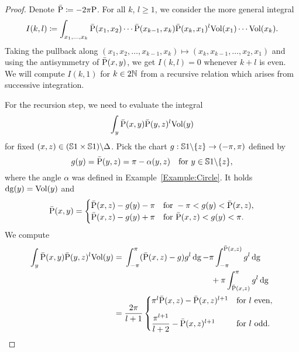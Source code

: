 \documentclass[\MainFolder/Text.tex]{subfiles}
\begin{document}
\begin{proof}
Denote $\bar{\mathrm{P}} \coloneqq -2\pi \mathrm{P}$. For all $k$, $l \ge 1$, we consider the more general integral
\[ I(k,l) \coloneqq \int_{x_1, \dotsc, x_k} \bar{\mathrm{P}}(x_1,x_2) \dotsm \bar{\mathrm{P}}(x_{k-1},x_k) \bar{\mathrm{P}}(x_k,x_1)^l\mathrm{Vol}(x_1) \dotsm \mathrm{Vol}(x_k). \]
Taking the pullback along $(x_1, x_2, \dotsc, x_{k-1}, x_k) \mapsto (x_k, x_{k-1}, \dotsc, x_2, x_1)$ and using the antisymmetry of $\bar{\mathrm{P}}(x,y)$, we get $I(k,l) = 0$ whenever $k+l$ is even. We will compute $I(k,1)$ for $k\in 2\mathbb{N}$ from a recursive relation which arises from successive integration.

For the recursion step, we need to evaluate the integral 
\[\int_{y} \bar{\mathrm{P}}(x,y)\bar{\mathrm{P}}(y,z)^l \mathrm{Vol}(y)\]
for fixed $(x,z)\in (\mathbb{S}{1}\times \mathbb{S}{1})\backslash\Delta$. Pick the chart $g: \mathbb{S}{1}\backslash\{z\} \rightarrow (-\pi,\pi)$ defined by 
\[ g(y)= \bar{\mathrm{P}}(y,z) =  \pi - \alpha(y,z) \quad\text{for } y\in \mathbb{S}{1}\backslash\{z\}, \]
where the angle $\alpha$ was defined in Example~\ref{Example:Circle}. It holds $\operatorname{dg}(y) = \mathrm{Vol}(y)$ and
\[ \bar{\mathrm{P}}(x,y) = \begin{cases} \bar{\mathrm{P}}(x,z) - g(y) - \pi & \text{for }-\pi< g(y)< \bar{\mathrm{P}}(x,z), \\
\bar{\mathrm{P}}(x,z) - g(y) + \pi & \text{for }\bar{\mathrm{P}}(x,z)<g(y)<\pi.
 \end{cases}\]
We compute
\begin{align*}
\int_{y} \bar{\Prpg}(x,y)\bar{\Prpg}(y,z)^l \Vol(y) &= \begin{multlined}[t] \int_{-\pi}^{\pi} (\bar{\Prpg}(x,z) - g)g^l \Diff{g} - \pi \int_{-\pi}^{\bar{\Prpg}(x,z)} g^l \Diff{g} \\ {}+ \pi \int_{\bar{\Prpg}(x,z)}^\pi g^l \Diff{g} \end{multlined} \\
 &=  \frac{2\pi}{l+1} \begin{cases}
  \pi^l \bar{\Prpg}(x,z) - \bar{\Prpg}(x,z)^{l+1} & \text{for }l\text{ even},\\[2ex]
  \dfrac{\pi^{l+1}}{l+2} - \bar{\Prpg}(x,z)^{l+1} & \text{for }l \text{ odd}.
 \end{cases}
\end{align*}



\end{proof}
\end{document}
